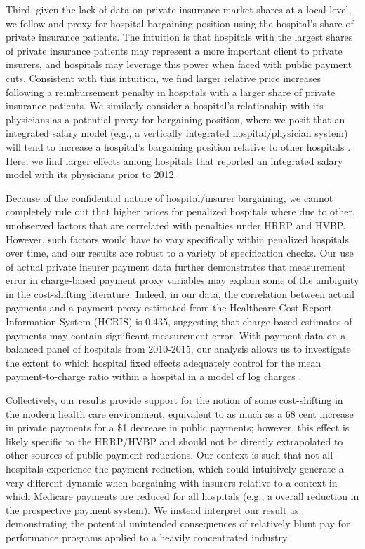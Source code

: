 \documentclass[12pt]{article}
\begin{document}
Third, given the lack of data on private insurance market shares at a local level, we follow \cite{wu2010} and proxy for hospital bargaining position using the hospital's share of private insurance patients. The intuition is that hospitals with the largest shares of private insurance patients may represent a more important client to private insurers, and hospitals may leverage this power when faced with public payment cuts. Consistent with this intuition, we find larger relative price increases following a reimbursement penalty in hospitals with a larger share of private insurance patients. We similarly consider a hospital's relationship with its physicians as a potential proxy for bargaining position, where we posit that an integrated salary model (e.g., a vertically integrated hospital/physician system) will tend to increase a hospital's bargaining position relative to other hospitals \citep{lewis2015}. Here, we find larger effects among hospitals that reported an integrated salary model with its physicians prior to 2012.

Because of the confidential nature of hospital/insurer bargaining, we cannot completely rule out that higher prices for penalized hospitals where due to other, unobserved factors that are correlated with penalties under HRRP and HVBP. However, such factors would have to vary specifically within penalized hospitals over time, and our results are robust to a variety of specification checks. Our use of actual private insurer payment data further demonstrates that measurement error in charge-based payment proxy variables may explain some of the ambiguity in the cost-shifting literature. Indeed, in our data, the correlation between actual payments and a payment proxy estimated from the Healthcare Cost Report Information System (HCRIS) is 0.435, suggesting that charge-based estimates of payments may contain significant measurement error. With payment data on a balanced panel of hospitals from 2010-2015, our analysis allows us to investigate the extent to which hospital fixed effects adequately control for the mean payment-to-charge ratio within a hospital in a model of log charges \citep{cutler2000}.

Collectively, our results provide support for the notion of some cost-shifting in the modern health care environment, equivalent to as much as a 68 cent increase in private payments for a \$1 decrease in public payments; however, this effect is likely specific to the HRRP/HVBP and should not be directly extrapolated to other sources of public payment reductions. Our context is such that not all hospitals experience the payment reduction, which could intuitively generate a very different dynamic when bargaining with insurers relative to a context in which Medicare payments are reduced for all hospitals (e.g., a overall reduction in the prospective payment system). We instead interpret our result as demonstrating the potential unintended consequences of relatively blunt pay for performance programs applied to a heavily concentrated industry.
\end{document}
